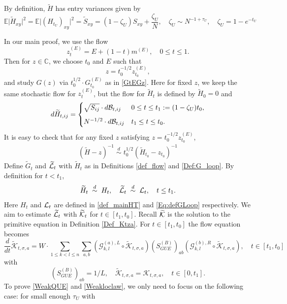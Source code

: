 \documentclass[10pt,reqno]{article}
\theoremstyle{plain} %
\theoremstyle{remark}
\numberwithin{equation}{section}
\begin{document}
 By definition, \( \widetilde{ H} \) has entry variances given by  
\[
\mathbb{E} \big| \widetilde{H}_{xy} \big|^2 =\mathbb{E} \big|  \left(H_{t_U}\right)_{xy} \big|^2= \widetilde{S}_{xy}  = (1-\zeta_U) S_{xy} + \frac{\zeta_U}{N}, \quad \zeta_U \sim  N^{-1+\tau_U}, \quad \zeta_U=1-e^{-t_U}
\]


  

In our main proof, we use the flow 
 $$
  z^{(E)}_t=E+(1-t) m^{(E)}  ,\quad 0\le t\le 1.   
$$ 
Then for \( z \in \mathbb{C} \), we choose \( t_0 \) and \( E \) such that  
\[
z = t_0^{-1/2} z_{t_0}^{(E)},
\]
and study \( G(z) \) via \( t_0^{1/2} \cdot G^{(E)}_{t_0} \) as in \eqref{GtEGz}. Here for fixed $z$,  we keep the same stochastic flow for \( z^{(E)}_t \), but the  flow for \( \widetilde{H}_t \) is defined by \( \widetilde{H}_0 = 0 \) and  
\[
d\widetilde{H}_{t,ij} =
\begin{cases}
    \sqrt{S_{ij}} \cdot d{\cal B}_{t,ij} & 0\le t \le t_1 := (1-\zeta_U)t_0, \\[6pt]
      N^{-1/2} \cdot d{\cal B}_{t,ij} &   t_1 \le   t\le t_0.
\end{cases} 
\]
It is easy to check that for any fixed $z$ satisfying $z = t_0^{-1/2} z_{t_0}^{(E)}$, 
\begin{align}\label{whheiyslwuw}
(\widetilde{H}-z)^{-1}\; \overset{d}{\sim}\;  t_0^{1/2}(\widetilde{H}_{t_0}-z_{t_0})^{-1} 
\end{align}
Define $\widetilde{G}_t$ and $\widetilde{{\cal L}}_t$ with $\widetilde{H}_t$ as in Definitions \ref{def_flow} and  \ref{Def:G_loop}. By definition for $t<t_1$, 
$$
 \widetilde{H}_t\; \overset{d}{\sim}\; H_t,\quad
\widetilde{{\cal L}}_t\;\overset{d}{\sim}\; {{\cal L}}_t, \quad t\le t_1.
 $$
 Here  $H_t$ and ${{\cal L}}_t$ are defined in \eqref{def_mainHT} and \eqref{Eq:defGLoop} respectively.  We aim to estimate $\widetilde{{\cal L}}_t$ with $\widetilde{{\cal K}}_t$ for $t\in [t_1,t_0]$. Recall  $\widetilde{{\cal K}}$ is the solution to the primitive equation in Definition \ref{Def_Ktza}. For  $t\in  [t_1,t_0]$ the flow equation    becomes 
$$\frac{d}{d t} \mathcal{\widetilde{K}}_{t, \sigma, a}=W \cdot \sum_{1 \leq k<l \leq n} \sum_{a, b}\left(\mathcal{G}_{k, l}^{(a), L} \circ \mathcal{\widetilde{K}}_{t, \sigma, a}\right) \left(S_{GUE}^{(B)}\right)_{a b}\left(\mathcal{G}_{k, l}^{(b), R} \circ \mathcal{\widetilde{K}}_{t, \sigma, a}\right),\quad t\in [t_1,t_0]
$$
with 
$$ \left(S^{(B)}_{GUE}\right)_{ab}=1/L, \quad \mathcal{\widetilde{K}}_{t, \sigma, a}=\mathcal{ {K}}_{t, \sigma, a},\quad t\in [0,t_1].
$$ 
To prove  \eqref{WeakQUE} and \eqref{Weakloclaw}, we only need to focus on the following case: for small enough $\tau_U$ with 
\end{document}
